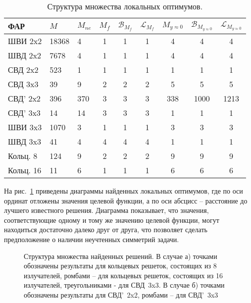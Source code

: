 \begin{table}[!h]
\centering
\caption{Структура множества локальных оптимумов.}
\begin{tabular}{|l | l l | c c c | c c c|}
    \hline
    \textbf{ФАР} & \textbf{$M$} & \textbf{$M_{ne}$} & \textbf{$M_{f}$} & \textbf{$\mathcal{B}_{M_f}$} & \textbf{$\mathcal{L}_{M_f}$} & \textbf{$M_{y\approx0}$} & \textbf{$\mathcal{B}_{M_{y\approx0}}$} & \textbf{$\mathcal{L}_{M_{y\approx0}}$}\\
    \hline
    ШВИ 2x2 & 18368 & 4 & 1 & 1 & 1 & 4 & 4 & 4\\
    ШВД 2x2 & 7678  & 4 & 1 & 1 & 1 & 4 & 4 & 4\\
    СВД 2x2  & 523  & 1 & 1 & 1 & 1 & 1 & 1 & 1\\
    СВД 3x3  & 39  & 9 & 2 & 2 & 2 & 5 & 5 & 5\\
    СВД' 2x2  & 396  & 370 & 3 & 3 & 3 & 338 & 1000 & 1213\\
    СВД' 3x3  & 14  & 14 & 3 & 3 & 3 & 1 & 1 & 1\\
    ШВИ 3x3 & 1070  & 3 & 1 & 1 & 1 & 3 & 3 & 3 \\
    ШВД 3x3 & 41  & 4 & 4 & 4 & 4 & 1 & 1 & 1 \\
    Кольц. 8 & 124  & 9 & 2 & 2 & 2 & 9 & 9 & 9\\
    Кольц. 16 & 11  & 6 & 1 & 1 & 1& 6 & 6 & 6\\
    \hline
\end{tabular}
    \label{tab:structure_0}
\end{table}

На рис.~\ref{ris:fit_dist_0} приведены диаграммы найденных локальных оптимумов, где по оси ординат отложены значения целевой функции, а по оси абсцисс -- расстояние до лучшего известного решения. Диаграмма показывает, что значения, соответствующие одному и тому же значению целевой функции, могут находиться достаточно далеко друг от друга, что позволяет сделать предположение о наличии неучтенных симметрий задачи.

\begin{figure}
\centering
    \begin{minipage}[h]{0.8\linewidth}
    \end{minipage}
    \begin{minipage}[h]{\linewidth}
    \end{minipage}
    \vspace{0.7em}
    \caption{Структура множества найденных решений. В случае а) точками обозначены результаты для кольцевых решеток, состоящих из 8 излучателей, ромбами -- для кольцевых решеток, состоящих из 16 излучателей, треугольниками - для СВД~3x3. В случае б) точками обозначены результаты для СВД'~2x2, ромбами -- для СВД'~3x3}
    \label{ris:fit_dist_0}
\end{figure}

